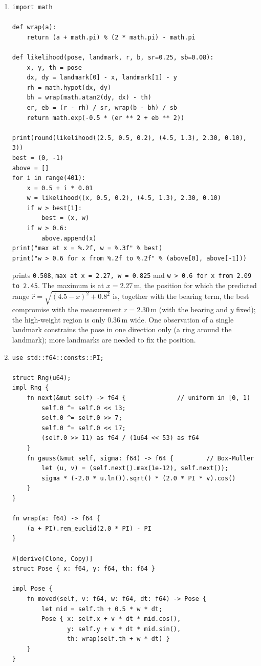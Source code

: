 \begin{enumerate}[label=\textbf{\ansnum.\arabic*}]
  \item
\begin{verbatim}
import math

def wrap(a):
    return (a + math.pi) % (2 * math.pi) - math.pi

def likelihood(pose, landmark, r, b, sr=0.25, sb=0.08):
    x, y, th = pose
    dx, dy = landmark[0] - x, landmark[1] - y
    rh = math.hypot(dx, dy)
    bh = wrap(math.atan2(dy, dx) - th)
    er, eb = (r - rh) / sr, wrap(b - bh) / sb
    return math.exp(-0.5 * (er ** 2 + eb ** 2))

print(round(likelihood((2.5, 0.5, 0.2), (4.5, 1.3), 2.30, 0.10), 3))
best = (0, -1)
above = []
for i in range(401):
    x = 0.5 + i * 0.01
    w = likelihood((x, 0.5, 0.2), (4.5, 1.3), 2.30, 0.10)
    if w > best[1]:
        best = (x, w)
    if w > 0.6:
        above.append(x)
print("max at x = %.2f, w = %.3f" % best)
print("w > 0.6 for x from %.2f to %.2f" % (above[0], above[-1]))
\end{verbatim}
prints \verb!0.508!, \verb!max at x = 2.27, w = 0.825! and \verb!w > 0.6 for x from 2.09 to 2.45!. The maximum is at $x=2.27$\,m, the position for which the predicted range $\hat r=\sqrt{(4.5-x)^2+0.8^2}$ is, together with the bearing term, the best compromise with the measurement $r=2.30$\,m (with the bearing and $y$ fixed); the high-weight region is only $0.36$\,m wide. One observation of a single landmark constrains the pose in one direction only (a ring around the landmark); more landmarks are needed to fix the position.
  \item
\begin{verbatim}
use std::f64::consts::PI;

struct Rng(u64);
impl Rng {
    fn next(&mut self) -> f64 {              // uniform in [0, 1)
        self.0 ^= self.0 << 13;
        self.0 ^= self.0 >> 7;
        self.0 ^= self.0 << 17;
        (self.0 >> 11) as f64 / (1u64 << 53) as f64
    }
    fn gauss(&mut self, sigma: f64) -> f64 {         // Box-Muller
        let (u, v) = (self.next().max(1e-12), self.next());
        sigma * (-2.0 * u.ln()).sqrt() * (2.0 * PI * v).cos()
    }
}

fn wrap(a: f64) -> f64 {
    (a + PI).rem_euclid(2.0 * PI) - PI
}

#[derive(Clone, Copy)]
struct Pose { x: f64, y: f64, th: f64 }

impl Pose {
    fn moved(self, v: f64, w: f64, dt: f64) -> Pose {
        let mid = self.th + 0.5 * w * dt;
        Pose { x: self.x + v * dt * mid.cos(),
               y: self.y + v * dt * mid.sin(),
               th: wrap(self.th + w * dt) }
    }
}


\end{verbatim}
\end{enumerate}
